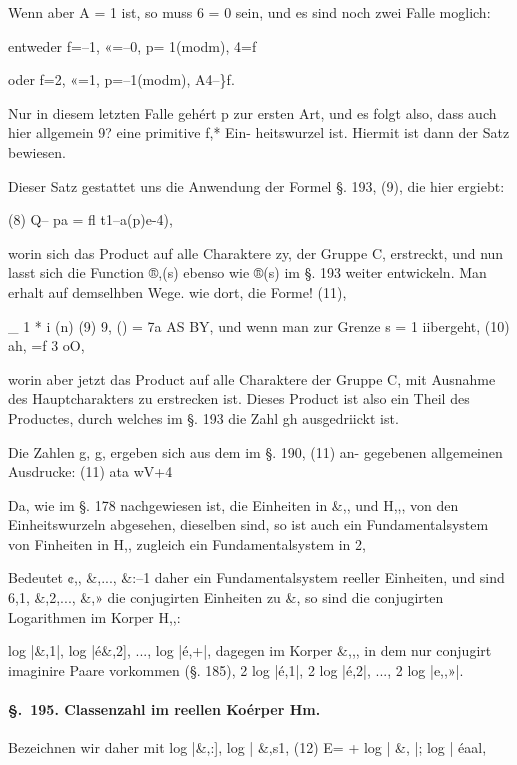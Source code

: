 \documentclass[12pt,a4paper]{article}
\theoremstyle{plain}
\theoremstyle{definition}
\begin{document}
Wenn aber A = 1 ist, so muss 6 = 0 sein, und es sind noch zwei Falle moglich:

entweder f=--1, «=--0, p= 1(modm), 4=f

oder f=2, «=1, p=--1(modm), A4--\}f.

Nur in diesem letzten Falle gehért p zur ersten Art, und es folgt also, dass auch hier allgemein 9? eine primitive f,* Ein- heitswurzel ist. Hiermit ist dann der Satz bewiesen.

Dieser Satz gestattet uns die Anwendung der Formel §. 193, (9), die hier ergiebt:

(8) Q-- pa = fl t1--a(p)e-4),

worin sich das Product auf alle Charaktere zy, der Gruppe C, erstreckt, und nun lasst sich die Function ®,(s) ebenso wie ®(s) im §. 193 weiter entwickeln. Man erhalt auf demselhben Wege. wie dort, die Forme! (11),

\_ 1 * i (n) (9) 9, () = 7a AS BY, und wenn man zur Grenze s = 1 iibergeht, (10) ah, =f 3 oO,

worin aber jetzt das Product auf alle Charaktere der Gruppe C, mit Ausnahme des Hauptcharakters zu erstrecken ist. Dieses Product ist also ein Theil des Productes, durch welches im §. 193 die Zahl gh ausgedriickt ist.

Die Zahlen g, g, ergeben sich aus dem im §. 190, (11) an- gegebenen allgemeinen Ausdrucke: (11) ata wV+4

Da, wie im §. 178 nachgewiesen ist, die Einheiten in \&,, und H,,, von den Einheitswurzeln abgesehen, dieselben sind, so ist auch ein Fundamentalsystem von Finheiten in H,, zugleich ein Fundamentalsystem in 2,

Bedeutet ¢,, \&,..., \&:--1 daher ein Fundamentalsystem reeller Einheiten, und sind 6,1, \&,2,..., \&,» die conjugirten Einheiten zu \&, so sind die conjugirten Logarithmen im Korper H,,:

log |\&,1|, log |é\&,2], ..., log |é,+|, dagegen im Korper \&,,, in dem nur conjugirt imaginire Paare vorkommen (§. 185), 2 log |é,1|, 2 log |é,2|, ..., 2 log |e,,»|.

\paragraph{\S.~195. Classenzahl im reellen Koérper Hm.}


Bezeichnen wir daher mit log |\&,:], log | \&,s1, (12) E= + log | \&, |; log | éaal,
\end{document}
